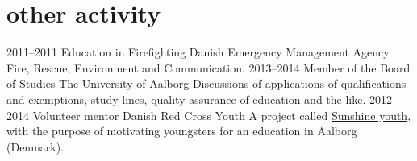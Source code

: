 \documentclass[print]{friggeri-cv}
\begin{document}
\section{other activity}

\begin{entrylist}
  \entry
    {2011--2011}
    {Education in Firefighting}
    {Danish Emergency Management Agency}
    {Fire, Rescue, Environment and Communication.}
  \entry
    {2013--2014}
    {Member of the Board of Studies}
    {The University of Aalborg}
    {Discussions of applications of qualifications and exemptions, study lines, quality assurance of education and the like.}
  \entry
    {2012--2014}
    {Volunteer mentor}
    {Danish Red Cross Youth}
    {A project called \href{http://www.urk.dk/solskinsunge/}{Sunshine youth}, with the purpose of motivating youngsters for an education in Aalborg (Denmark).}
\end{entrylist}
\end{document}
